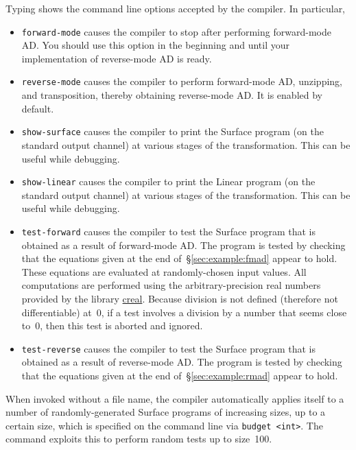 \documentclass{article}
\begin{document}
Typing  shows the command line options accepted by the
compiler. In particular,
\begin{itemize}
\item \texttt{\dash forward-mode} causes the compiler to stop after performing
      forward-mode AD. You should use this option in the beginning and until
      your implementation of reverse-mode AD is ready.
\item \texttt{\dash reverse-mode} causes the compiler to perform
      forward-mode AD, unzipping, and transposition,
      thereby obtaining reverse-mode AD. It is enabled by default.
\item \texttt{\dash show-surface} causes the compiler to print the Surface
      program (on the standard output channel) at various stages of the
      transformation. This can be useful while debugging.
\item \texttt{\dash show-linear} causes the compiler to print the Linear
      program (on the standard output channel) at various stages of the
      transformation. This can be useful while debugging.
\item \texttt{\dash test-forward} causes the compiler to test the Surface
      program that is obtained as a result of forward-mode AD. The program is
      tested by checking that the equations given at the end
      of~\S\ref{sec:example:fmad} appear to hold. These equations
      are evaluated at randomly-chosen input values.
      All computations are performed using the
      arbitrary-precision real numbers provided by the library
      \href{https://github.com/backtracking/creal}{creal}.
      Because division is not defined (therefore not differentiable) at~0,
      if a test involves a division by a number that seems close to~0,
      then this test is aborted and ignored.
\item \texttt{\dash test-reverse} causes the compiler to test the Surface
      program that is obtained as a result of reverse-mode AD. The program is
      tested by checking that the equations given at the end
      of~\S\ref{sec:example:rmad} appear to hold.
\end{itemize}

When invoked without a file name, the compiler automatically applies itself to
a number of randomly-generated Surface programs of increasing sizes, up to a
certain size, which is specified on the command line via \texttt{\dash budget
  <int>}. The command  exploits this to perform random tests up
to size~100.
\end{document}
